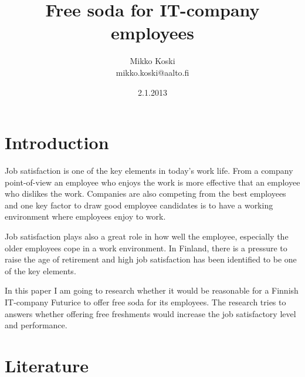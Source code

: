 \documentclass[a4paper]{article}
\begin{document}
\title{\huge Free soda for IT-company employees}
\date{2.1.2013}
\author{Mikko Koski \\ mikko.koski@aalto.fi}
\maketitle

\large

\section{Introduction}

\begin{comment}
Why is this research important? 
Is there a bigger phenomenon that this research of yours is part of? 
Why people in your profession should care about this thesis?
\end{comment}

Job satisfaction is one of the key elements in today's work life. From a company point-of-view an employee who enjoys the work is more effective that an employee who dislikes the work. Companies are also competing from the best employees and one key factor to draw good employee candidates is to have a working environment where employees enjoy to work.

Job satisfaction plays also a great role in how well the employee, especially the older employees cope in a work environment. In Finland, there is a pressure to raise the age of retirement and high job satisfaction has been identified to be one of the key elements.

In this paper I am going to research whether it would be reasonable for a Finnish IT-company Futurice to offer free soda for its employees. The research tries to answers whether offering free freshments would increase the job satisfactory level and performance. 

\section{Literature}

\begin{comment}
What has been done related to this (mainly in academic publications)? 
What do the authors say about the topic? 
How does your research question relate to these previous studies? 
How do you apply them or add to them? Based on what they say, what do you say?  
\end{comment}
\end{document}

